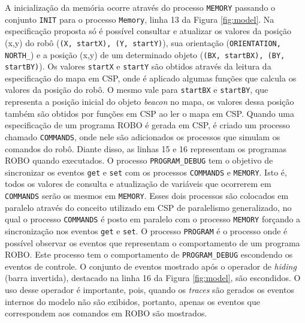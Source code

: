 A inicialização da memória ocorre através do processo \texttt{MEMORY} passando o conjunto \texttt{INIT} para o processo \texttt{Memory}, linha 13 da Figura \ref{fig:model}. Na especificação proposta só é possível consultar e atualizar os valores da posição (x,y) do robô (\texttt{(X, startX), (Y, startY)}), sua orientação (\texttt{ORIENTATION, NORTH\_}) e a posição (x,y) de um determinado objeto (\texttt{(BX, startBX), (BY, startBY)}). Os valores \texttt{startX} e \texttt{startY} são obtidos através da leitura da especificação do mapa em CSP, onde é aplicado algumas funções que calcula os valores da posição do robô. O mesmo vale para \texttt{startBX} e \texttt{startBY}, que representa a posição inicial do objeto \textit{beacon} no mapa, os valores dessa posição também são obtidos por funções em CSP ao ler o mapa em CSP. Quando uma especificação de um programa ROBO é gerada em CSP, é criado um processo chamado \texttt{COMMANDS}, onde nele são adicionados os processos que simulam os comandos do robô. Diante disso, as linhas 15 e 16 representam os programas ROBO quando executados. O processo \texttt{PROGRAM\_DEBUG} tem o objetivo de sincronizar os eventos \texttt{get} e \texttt{set} com os processos \texttt{COMMANDS} e \texttt{MEMORY}. Isto é, todos os valores de consulta e atualização de variáveis que ocorrerem em \texttt{COMMANDS} serão os mesmos em \texttt{MEMORY}. Esses dois processos são colocados em paralelo através do conceito utilizado em CSP de paralelismo generalizado, no qual o processo \texttt{COMMANDS} é posto em paralelo com o processo \texttt{MEMORY} forçando a sincronização nos eventos \texttt{get} e \texttt{set}. O processo \texttt{PROGRAM} é o processo onde é possível observar os eventos que representam o comportamento de um programa ROBO. Este processo tem o comportamento de \texttt{PROGRAM\_DEBUG} escondendo os eventos de controle. O conjunto de eventos mostrado após o operador de \textit{hiding} (barra invertida), destacado na linha 16 da Figura \ref{fig:model}, são escondidos. O uso desse operador é importante, pois, quando os \textit{traces} são gerados os eventos internos do modelo não são exibidos, portanto, apenas os eventos que correspondem aos comandos em ROBO são mostrados.

